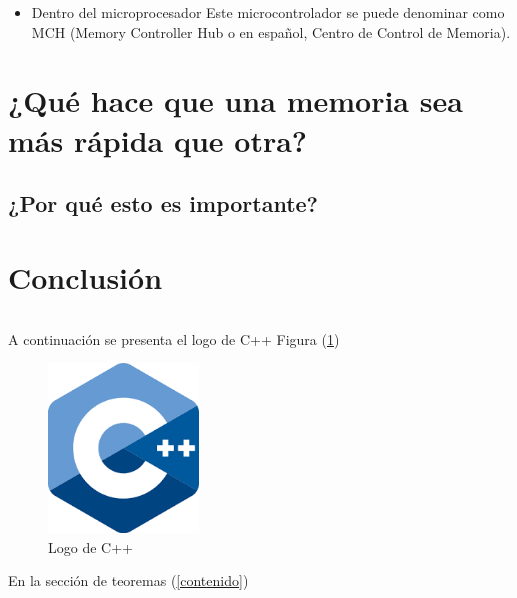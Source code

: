\documentclass{article}
\begin{document}
\begin{itemize}
\item{ Dentro del microprocesador Este microcontrolador se puede denominar como MCH (Memory Controller Hub o en español, Centro de Control de Memoria).}
\end{itemize}


\section{¿Qué hace que una memoria sea más rápida que otra?}

\subsection{¿Por qué esto es importante?}



\section{Conclusión} \label{conclulsion}


\begin{lstlisting}

\end{lstlisting}

A continuación se presenta el logo de C++ Figura (\ref{fig:cpplogo})

\begin{figure}[h]
\includegraphics[width=4cm]{cpplogo.png}
\centering
\caption{Logo de C++}
\label{fig:cpplogo}
\end{figure}

En la sección de teoremas (\ref{contenido})



 

\end{document}
